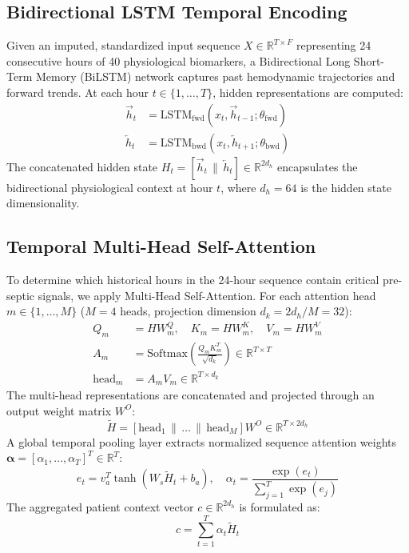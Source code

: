 \documentclass[journal,twocolumn,10pt]{IEEEtran}
\begin{document}
\subsection{Bidirectional LSTM Temporal Encoding}
Given an imputed, standardized input sequence $X \in \mathbb{R}^{T \times F}$ representing 24 consecutive hours of 40 physiological biomarkers, a Bidirectional Long Short-Term Memory (BiLSTM) network captures past hemodynamic trajectories and forward trends. At each hour $t \in \{1, \dots, T\}$, hidden representations are computed:
\begin{align}
\vec{h}_t &= \text{LSTM}_{\text{fwd}}(x_t, \vec{h}_{t-1}; \theta_{\text{fwd}}) \\
\overleftarrow{h}_t &= \text{LSTM}_{\text{bwd}}(x_t, \overleftarrow{h}_{t+1}; \theta_{\text{bwd}})
\end{align}
The concatenated hidden state $H_t = [\vec{h}_t \,\|\, \overleftarrow{h}_t] \in \mathbb{R}^{2d_h}$ encapsulates the bidirectional physiological context at hour $t$, where $d_h = 64$ is the hidden state dimensionality.

\subsection{Temporal Multi-Head Self-Attention}
To determine which historical hours in the 24-hour sequence contain critical pre-septic signals, we apply Multi-Head Self-Attention. For each attention head $m \in \{1, \dots, M\}$ ($M = 4$ heads, projection dimension $d_k = 2d_h / M = 32$):
\begin{align}
Q_m &= H W_m^Q, \quad K_m = H W_m^K, \quad V_m = H W_m^V \\
A_m &= \text{Softmax}\left(\frac{Q_m K_m^T}{\sqrt{d_k}}\right) \in \mathbb{R}^{T \times T} \\
\text{head}_m &= A_m V_m \in \mathbb{R}^{T \times d_k}
\end{align}
The multi-head representations are concatenated and projected through an output weight matrix $W^O$:
\begin{equation}
\tilde{H} = [\text{head}_1 \,\|\, \dots \,\|\, \text{head}_M] W^O \in \mathbb{R}^{T \times 2d_h}
\end{equation}
A global temporal pooling layer extracts normalized sequence attention weights $\boldsymbol{\alpha} = [\alpha_1, \dots, \alpha_T]^T \in \mathbb{R}^T$:
\begin{equation}
e_t = v_a^T \tanh(W_s \tilde{H}_t + b_a), \quad \alpha_t = \frac{\exp(e_t)}{\sum_{j=1}^{T} \exp(e_j)}
\end{equation}
The aggregated patient context vector $c \in \mathbb{R}^{2d_h}$ is formulated as:
\begin{equation}
c = \sum_{t=1}^{T} \alpha_t \tilde{H}_t
\end{equation}
\end{document}

